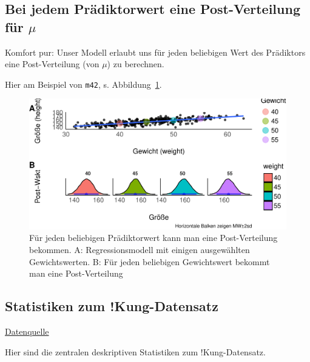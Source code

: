 \documentclass[
  a4paper,
  DIV=11]{scrreprt}
\theoremstyle{definition}
\theoremstyle{remark}
\begin{document}
\hypertarget{bei-jedem-pruxe4diktorwert-eine-post-verteilung-fuxfcr-mu}{%
\subsection{\texorpdfstring{Bei jedem Prädiktorwert eine Post-Verteilung
für
\(\mu\)}{Bei jedem Prädiktorwert eine Post-Verteilung für \textbackslash mu}}\label{bei-jedem-pruxe4diktorwert-eine-post-verteilung-fuxfcr-mu}}

Komfort pur: Unser Modell erlaubt uns für jeden beliebigen Wert des
Prädiktors eine Post-Verteilung (von \(\mu\)) zu berechnen.

Hier am Beispiel von \texttt{m42}, s. Abbildung~\ref{fig-post42}.

\begin{figure}

{\centering \includegraphics[width=1\textwidth,height=\textheight]{./lineare-modelle_files/figure-pdf/fig-post42-1.pdf}

}

\caption{\label{fig-post42}Für jeden beliebigen Prädiktorwert kann man
eine Post-Verteilung bekommen. A: Regressionsmodell mit einigen
ausgewählten Gewichtswerten. B: Für jeden beliebigen Gewichtswert
bekommt man eine Post-Verteilung}

\end{figure}

\hypertarget{statistiken-zum-kung-datensatz}{%
\subsection{Statistiken zum
!Kung-Datensatz}\label{statistiken-zum-kung-datensatz}}

\href{https://raw.githubusercontent.com/sebastiansauer/Lehre/main/data/Howell1a.csv}{Datenquelle}

Hier sind die zentralen deskriptiven Statistiken zum !Kung-Datensatz.
\end{document}
